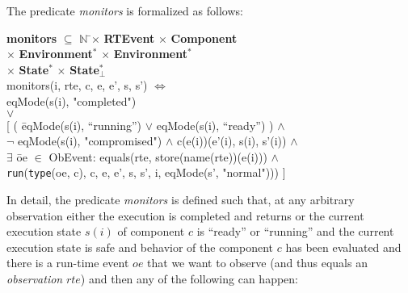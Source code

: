 \documentclass[conference]{IEEEtran}
\begin{document}
The predicate \emph{monitors} is formalized as follows:
\begin{tabbing}
\textbf{monitors}  $\subseteq$ $\mathbb{N}$ \=$\times$ \textbf{RTEvent} $\times$ \textbf{Component} \\\>$\times$ \textbf{Environment}$^*$ $\times$ \textbf{Environment}$^*$
\\\>$\times$ \textbf{State}$^*$ $\times$ \textbf{State}$_\bot^*$
\\monitors(i, \textlbrackdbl rte\textrbrackdbl, \textlbrackdbl c\textrbrackdbl, e, e', s, s') $\Leftrightarrow$
\\ eqMode(s(i), "completed")
\\ $\vee$
\\ {[} ( \=eqMode(s(i), ``running'') $\vee$  eqMode(s(i), ``ready'') )  $\wedge$ 
\\\>$\neg$ eqMode(s(i), "compromised") $\wedge$ \textlbrackdbl c\textrbrackdbl(e(i))(e'(i), s(i), s'(i)) $\wedge$
\\\> $\exists$ \=oe $\in$ ObEvent: equals(rte, store(\textlbrackdbl name(rte)\textrbrackdbl)(e(i))) $\wedge$ 
\\\>\> {\tt run}({\tt type}(oe, c), c, e, e', s, s', i, eqMode(s', "normal"))) {]}
\end{tabbing}
In detail, the predicate \emph{monitors} is defined such that, at any arbitrary observation either the execution is completed and returns or the current execution state $s(i)$ of component $c$ is ``ready'' or ``running'' and the current execution state is safe and behavior of the component $c$ has been evaluated and there is a run-time event $oe$ that we want to observe (and thus equals an \emph{observation} $rte$) and then any of the following
can happen:
\end{document}
